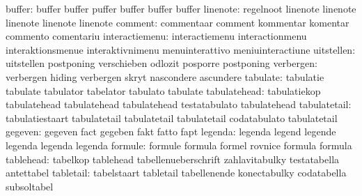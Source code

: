                    buffer: buffer                    buffer
                           puffer                    buffer
                           buffer                    buffer
                 linenote: regelnoot                 linenote
                           linenote                  linenote
                           linenote                  linenote
                  comment: commentaar                comment
                           kommentar                 komentar
                           commento                  comentariu
           interactiemenu: interactiemenu            interactionmenu
                           interaktionsmenue         interaktivnimenu
                           menuinterattivo           meniuinteractiune
               uitstellen: uitstellen                postponing
                           verschieben               odlozit
                           posporre                  postponing %
                verbergen: verbergen                 hiding
                           verbergen                 skryt
                           nascondere                ascundere
                 tabulate: tabulatie                 tabulate
                           tabulator                 tabelator
                           tabulato                  tabulate
             tabulatehead: tabulatiekop              tabulatehead
                           tabulatehead              tabulatehead
                           testatabulato             tabulatehead %
             tabulatetail: tabulatiestaart           tabulatetail
                           tabulatetail              tabulatetail
                           codatabulato              tabulatetail %
                  gegeven: gegeven                   fact
                           gegeben                   fakt
                           fatto                     fapt
                  legenda: legenda                   legend
                           legende                   legenda
                           legenda                   legenda
                  formule: formule                   formula
                           formel                    rovnice
                           formula                   formula
                tablehead: tabelkop                  tablehead
                           tabellenueberschrift      zahlavitabulky
                           testatabella              antettabel
                tabletail: tabelstaart               tabletail
                           tabellenende              konectabulky
                           codatabella               subsoltabel
